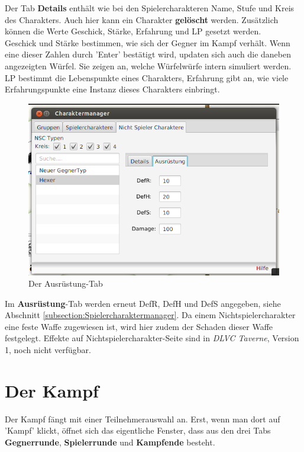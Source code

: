 \documentclass[11pt, a4paper, german]{article}
\begin{document}
Der Tab \textbf{Details} enthält wie bei den Spielercharakteren Name, Stufe und Kreis des Charakters. Auch hier kann ein Charakter \textbf{gelöscht} werden. 
Zusätzlich können die Werte Geschick, Stärke, Erfahrung und LP gesetzt werden.\\
 Geschick und Stärke bestimmen, wie sich der Gegner im Kampf verhält. Wenn eine dieser Zahlen durch 'Enter' bestätigt wird, updaten sich auch die daneben angezeigten Würfel. 
Sie zeigen an, welche Würfelwürfe intern simuliert werden. LP bestimmt die Lebenspunkte eines Charakters, Erfahrung gibt an, wie viele Erfahrungspunkte eine Instanz dieses Charakters einbringt.\\
\begin{figure}
\centering
\includegraphics[width=1\linewidth]{Bilder/Nichtspielertypmanager2}
\caption{Der Ausrüstung-Tab}
\label{fig:Nichtspielertypmanager2}
\end{figure}

Im \textbf{Ausrüstung}-Tab werden erneut DefR, DefH und DefS angegeben, siehe Abschnitt \ref{subsection:Spielercharaktermanager}. 
Da einem Nichtspielercharakter eine feste Waffe zugewiesen ist, wird hier zudem der Schaden dieser Waffe festgelegt. Effekte auf Nichtspielercharakter-Seite sind in \textit{DLVC Taverne}, Version 1, noch nicht verfügbar.

\clearpage
\section{Der Kampf}\label{Abschnitt:Kampf}
Der Kampf fängt mit einer Teilnehmerauswahl an. Erst, wenn man dort auf 'Kampf' klickt, öffnet sich das eigentliche Fenster, dass aus den drei Tabs \textbf{Gegnerrunde}, \textbf{Spielerrunde} und \textbf{Kampfende} besteht.
\end{document}
